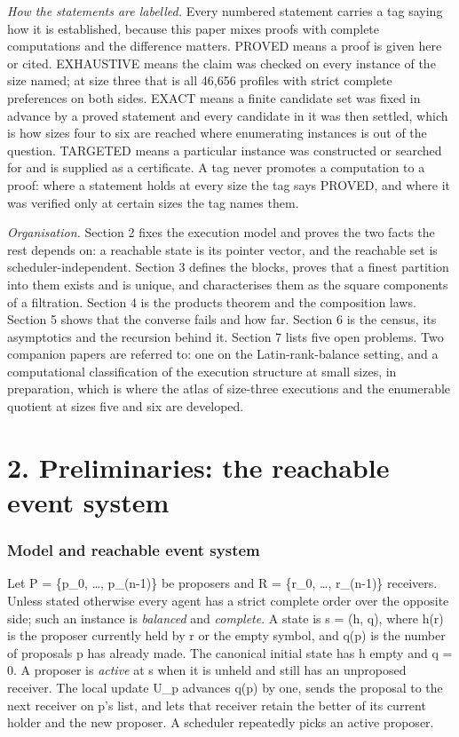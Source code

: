 \documentclass[
  11pt,
]{article}
\begin{document}
\emph{How the statements are labelled.} Every numbered statement carries
a tag saying how it is established, because this paper mixes proofs with
complete computations and the difference matters. PROVED means a proof
is given here or cited. EXHAUSTIVE means the claim was checked on every
instance of the size named; at size three that is all 46,656 profiles
with strict complete preferences on both sides. EXACT means a finite
candidate set was fixed in advance by a proved statement and every
candidate in it was then settled, which is how sizes four to six are
reached where enumerating instances is out of the question. TARGETED
means a particular instance was constructed or searched for and is
supplied as a certificate. A tag never promotes a computation to a
proof: where a statement holds at every size the tag says PROVED, and
where it was verified only at certain sizes the tag names them.

\emph{Organisation.} Section 2 fixes the execution model and proves the
two facts the rest depends on: a reachable state is its pointer vector,
and the reachable set is scheduler-independent. Section 3 defines the
blocks, proves that a finest partition into them exists and is unique,
and characterises them as the square components of a filtration. Section
4 is the products theorem and the composition laws. Section 5 shows that
the converse fails and how far. Section 6 is the census, its asymptotics
and the recursion behind it. Section 7 lists five open problems. Two
companion papers are referred to: one on the Latin-rank-balance setting,
and a computational classification of the execution structure at small
sizes, in preparation, which is where the atlas of size-three executions
and the enumerable quotient at sizes five and six are developed.

\hypertarget{preliminaries-the-reachable-event-system}{%
\section{2. Preliminaries: the reachable event
system}\label{preliminaries-the-reachable-event-system}}

\hypertarget{model-and-reachable-event-system}{%
\subsubsection{Model and reachable event
system}\label{model-and-reachable-event-system}}

Let P = \{p\_0, \ldots, p\_(n-1)\} be proposers and R = \{r\_0, \ldots,
r\_(n-1)\} receivers. Unless stated otherwise every agent has a strict
complete order over the opposite side; such an instance is
\emph{balanced} and \emph{complete}. A state is s = (h, q), where h(r)
is the proposer currently held by r or the empty symbol, and q(p) is the
number of proposals p has already made. The canonical initial state has
h empty and q = 0. A proposer is \emph{active} at s when it is unheld
and still has an unproposed receiver. The local update U\_p advances
q(p) by one, sends the proposal to the next receiver on p's list, and
lets that receiver retain the better of its current holder and the new
proposer. A scheduler repeatedly picks an active proposer.
\end{document}
